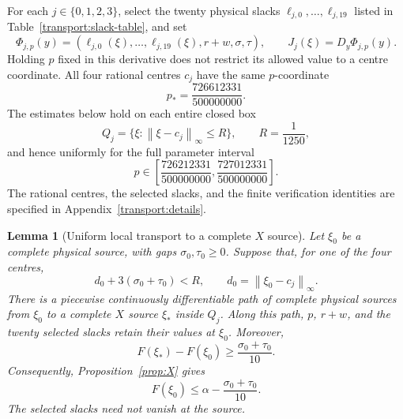 \documentclass[11pt,reqno]{amsart}
\newtheorem{lemma}[theorem]{Lemma}
\theoremstyle{definition}
\theoremstyle{remark}
\newcommand{\iin}[1]{\left\|#1\right\|_\infty}
\begin{document}
For each \(j\in\{0,1,2,3\}\), select the twenty physical slacks
\(\ell_{j,0},\ldots,\ell_{j,19}\) listed in
Table~\ref{transport:slack-table}, and set
\begin{equation}\label{transport:coordinate-map}
\Phi_{j,p}(y)=
 (\ell_{j,0}(\xi),\ldots,\ell_{j,19}(\xi),r+w,\sigma,\tau),
\qquad J_j(\xi)=D_y\Phi_{j,p}(y).
\end{equation}
Holding \(p\) fixed in this derivative does not restrict its allowed
value to a centre coordinate.  All four rational centres \(c_j\) have
the same \(p\)-coordinate
\[
p_* = \frac{726612331}{500000000}.
\]
The estimates below hold on each entire closed box
\begin{equation}\label{transport:outer-box}
Q_j=\{\xi:\iin{\xi-c_j}\le R\},\qquad R=\frac1{1250},
\end{equation}
and hence uniformly for the full parameter interval
\begin{equation}\label{transport:p-interval}
p\in\left[\frac{726212331}{500000000},
            \frac{727012331}{500000000}\right].
\end{equation}
The rational centres, the selected slacks, and the finite verification
identities are specified in Appendix~\ref{transport:details}.

\begin{lemma}[Uniform local transport to a complete \(X\) source]
\label{transport:local-lemma}
Let \(\xi_0\) be a complete physical source, with gaps
\(\sigma_0,\tau_0\ge0\).  Suppose that, for one of the four centres,
\begin{equation}\label{transport:strict-start}
d_0+3(\sigma_0+\tau_0)<R,
\qquad d_0=\iin{\xi_0-c_j}.
\end{equation}
There is a piecewise continuously differentiable path of complete
physical sources from \(\xi_0\) to a complete \(X\) source \(\xi_*\)
inside \(Q_j\).  Along this path, \(p\), \(r+w\), and the twenty
selected slacks retain their values at \(\xi_0\).  Moreover,
\[
F(\xi_*)-F(\xi_0)\ge\frac{\sigma_0+\tau_0}{10}.
\]
Consequently, Proposition~\ref{prop:X} gives
\begin{equation}\label{eq:gapsafe}
F(\xi_0)\le\alpha-\frac{\sigma_0+\tau_0}{10}.
\end{equation}
The selected slacks need not vanish at the source.
\end{lemma}
\end{document}
